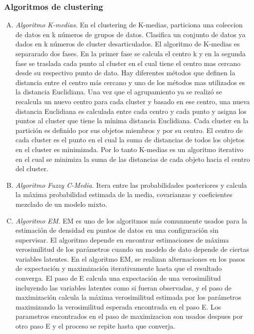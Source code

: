 \documentclass[12pt]{report}
\begin{document}
\subsubsection{Algoritmos de clustering}
\begin{enumerate}[A.]
\item \textit{Algoritmo K-medias.} En el clustering de K-medias, particiona una coleccion de datos en k números de grupos de datos. Clasifica un conjunto de datos ya dados en k números de cluster desarticulados. El algoritmo de K-medias es separarado dos fases.
En la primer fase se calcula el centro k y en la segunda fase se traslada cada punto al cluster en el cual tiene el centro mas cercano desde su respectivo punto de dato. Hay diferentes métodos que definen la distancia entre el centro más cercano y uno de los métodos mas utilizados es la distancia Euclidiana. Una vez que el agrupamiento ya se realizó se recalcula un nuevo centro para cada cluster y basado en ese centro, una nueva distancia Euclidiana es calculada entre cada centro y cada punto y asigna los puntos al cluster que tiene la mínima distancia Euclidiana.
Cada cluster en la partición es definido por sus objetos miembros y por su centro. El centro de cada cluster es el punto en el cual la suma de distancias de todos los objetos en el cluster es minimizada. Por lo tanto K-medias es un algoritmo iterativo en el cual se minimiza la suma de las distancias de cada objeto hacia el centro del cluster.\cite{kmed}

\item \textit{Algoritmo Fuzzy C-Media.} Itera entre las probabilidades posteriores y calcula la máxima probabilidad estimada de la media, covarianzas y coeficientes mezclado de un modelo mixto.

\item \textit{Algoritmo EM.} EM es uno de los algoritmos más comunmente usados para la estimación de densidad en puntos de datos en una configuración sin supervisar. El algoritmo depende en encontrar estimaciones de máxima verosimilitud de los parámetros cuando un modelo de dato depende de ciertas variables latentes. En el algoritmo EM, se realizan alternaciones en los pasos de expectación y maximización iterativamente hasta que el resultado converga. El paso de E calcula una expectación de una verosimilitud incluyendo las variables latentes como si fueran observadas, y el paso de maximización  calcula la máxima verosimilitud estimada por los parámetros maximizando la verosimilitud esperada encontrada en el paso E. Los parametros encontrados en el paso de maximizacion son usados despues por otro paso E y el proceso se repite hasta que converja.\cite{em}

\end{enumerate}
\end{document}
